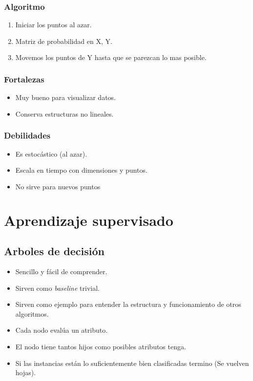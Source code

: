 \documentclass[titlepage,a4paper]{article}
\begin{document}
\subsubsection*{Algoritmo}
\begin{enumerate}
    \item Iniciar los puntos al azar.
    \item Matriz de probabilidad en X, Y.
    \item Movemos los puntos de Y hasta que se parezcan lo mas posible.
\end{enumerate}

\subsubsection*{Fortalezas}
\begin{itemize}
    \item Muy bueno para visualizar datos.
    \item Conserva estructuras no lineales.
\end{itemize}

\subsubsection*{Debilidades}
\begin{itemize}
    \item Es estocástico (al azar).
    \item Escala en tiempo con dimensiones y puntos.
    \item No sirve para nuevos puntos
\end{itemize}

\newpage

\section{Aprendizaje supervisado}
\subsection{Arboles de decisión}
\begin{itemize}
    \item Sencillo y fácil de comprender.
    \item Sirven como \textit{baseline} trivial.
    \item Sirven como ejemplo para entender la estructura y funcionamiento de otros algoritmos.
    \item Cada nodo evalúa un atributo.
    \item El nodo tiene tantos hijos como posibles atributos tenga.
    \item Si las instancias están lo suficientemente bien clasificadas termino (Se vuelven hojas).
\end{itemize}
\end{document}
